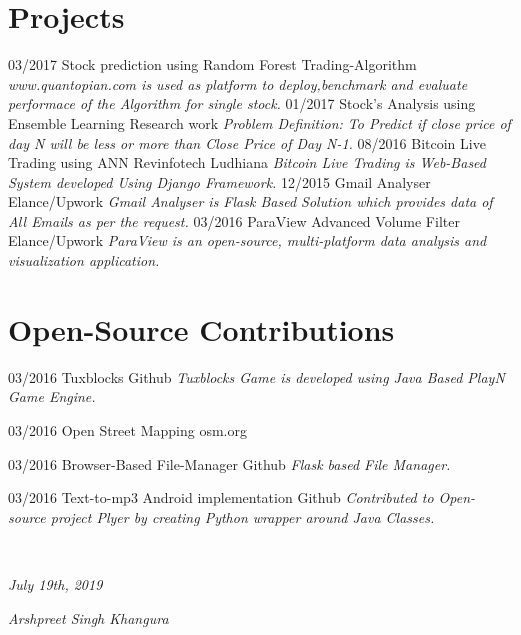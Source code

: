 \documentclass[]{friggeri-cv}
\begin{document}
\section{Projects}
\begin{entrylist}
 \entry
    {03/2017}
    {Stock prediction using Random Forest}
    {Trading-Algorithm}
    {\emph{www.quantopian.com is used as platform to deploy,benchmark and evaluate performace of the Algorithm for
    single stock.}}
 \entry
    {01/2017}
    {Stock's Analysis using Ensemble Learning}
    {Research work}
    {\emph{Problem Definition: To Predict if close price of day N will be less or more than Close Price of Day N-1.}}
 \entry
    {08/2016}
    {Bitcoin Live Trading using ANN}
    {Revinfotech Ludhiana}
    {\emph{Bitcoin Live Trading is Web-Based System developed Using Django
    Framework.}}
  \entry
    {12/2015}
    {Gmail Analyser}
    {Elance/Upwork}
    {\emph{Gmail Analyser is Flask Based Solution which provides data of All Emails
as per the request.}}
  \entry
    {03/2016}
    {ParaView Advanced Volume Filter}
    {Elance/Upwork}
    {\emph{ParaView is an open-source, multi-platform data analysis and visualization
application.}}
\end{entrylist}

\section{Open-Source Contributions}
\begin{entrylist}
 \entry
    {03/2016}
    {Tuxblocks}
    {Github}
    {\emph{Tuxblocks Game is developed using Java Based PlayN Game Engine.}}

 \entry
    {03/2016}
    {Open Street Mapping}
    {osm.org}
    {\emph{}}

 \entry
    {03/2016}
    {Browser-Based File-Manager}
    {Github}
    {\emph{Flask based File Manager.}}

 \entry
    {03/2016}
    {Text-to-mp3 Android implementation}
    {Github}
    {\emph{Contributed to Open-source project Plyer by creating Python wrapper around
Java Classes.}}


\end{entrylist}


\\
\begin{flushleft}
\emph{July 19th, 2019}
\end{flushleft}
\begin{flushright}
\emph{Arshpreet Singh Khangura}
\end{flushright}
\end{document}
